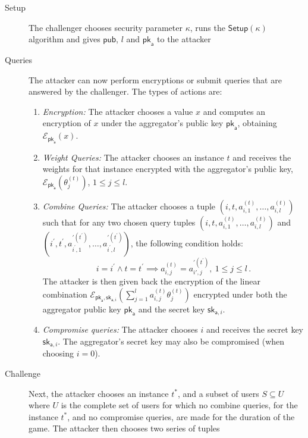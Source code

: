\begin{description}
    \item[Setup] The challenger chooses security parameter $\kappa$, runs the $\mathsf{Setup}(\kappa)$ algorithm and gives $\mathsf{pub}$, $l$ and $\mathsf{pk}_{\mathsf{a}}$ to the attacker
    \item[Queries] The attacker can now perform encryptions or submit queries that are answered by the challenger. The types of actions are:
    \begin{enumerate}
        \item \textit{Encryption:} The attacker chooses a value $x$ and computes an encryption of $x$ under the aggregator's public key $\mathsf{pk}_{\mathsf{a}}$, obtaining $\mathcal{E}_{\mathsf{pk}_{\mathsf{a}}}(x)$.
        \item \textit{Weight Queries:} The attacker chooses an instance $t$ and receives the weights for that instance encrypted with the aggregator's public key, $\mathcal{E}_{\mathsf{pk}_{\mathsf{a}}}(\theta^{(t)}_{j})$, $1\leq j\leq l$.
        \item \textit{Combine Queries:} The attacker chooses a tuple $(i,t,a^{(t)}_{i,1},\dots,a^{(t)}_{i,l})$ such that for any two chosen query tuples $(i,t,a^{(t)}_{i,1},\dots,a^{(t)}_{i,l})$ and $(i^\prime,t^\prime,a^{\prime(t^\prime)}_{i^\prime,1},\dots,a^{\prime(t^\prime)}_{i^\prime,l})$, the following condition holds:
        \begin{equation*}
            i = i^\prime \wedge t = t^\prime \implies a^{(t)}_{i,j} = a^{\prime(t^\prime)}_{i',j},\ 1\leq j\leq l\,.
        \end{equation*}
        The attacker is then given back the encryption of the linear combination $\mathcal{E}_{\mathsf{pk}_{\mathsf{a}},\mathsf{sk}_{\mathsf{a}, i}}(\sum^l_{j=1}a^{(t)}_{i,j}\theta^{(t)}_j)$ encrypted under both the aggregator public key $\mathsf{pk}_{\mathsf{a}}$ and the secret key $\mathsf{sk}_{\mathsf{a}, i}$.
        \item \textit{Compromise queries:} The attacker chooses $i$ and receives the secret key $\mathsf{sk}_{\mathsf{a}, i}$. The aggregator's secret key may also be compromised (when choosing $i=0$).
    \end{enumerate} 
    \item[Challenge] Next, the attacker chooses an instance $t^*$, and a subset of users $S \subseteq U$ where $U$ is the complete set of users for which no combine queries, for the instance $t^*$, and no compromise queries, are made for the duration of the game. The attacker then chooses two series of tuples

\end{description}
